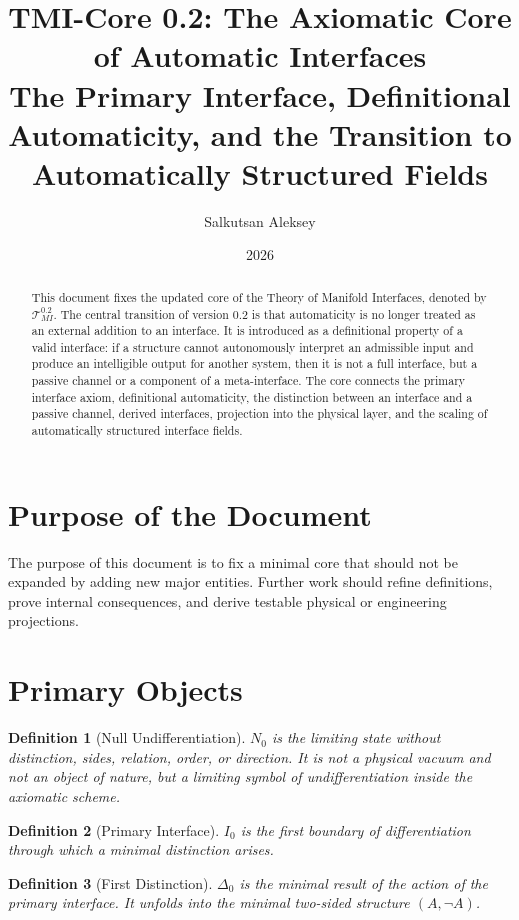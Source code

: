 \documentclass[12pt,a4paper]{article}
\title{\textbf{TMI-Core 0.2: The Axiomatic Core of Automatic Interfaces}\\
\large The Primary Interface, Definitional Automaticity, and the Transition to Automatically Structured Fields}
\author{Salkutsan Aleksey}
\date{2026}
\newtheorem{definition}{Definition}
\begin{document}
\maketitle

\begin{abstract}
This document fixes the updated core of the Theory of Manifold Interfaces, denoted by \(\mathcal T_{MI}^{0.2}\). The central transition of version 0.2 is that automaticity is no longer treated as an external addition to an interface. It is introduced as a definitional property of a valid interface: if a structure cannot autonomously interpret an admissible input and produce an intelligible output for another system, then it is not a full interface, but a passive channel or a component of a meta-interface. The core connects the primary interface axiom, definitional automaticity, the distinction between an interface and a passive channel, derived interfaces, projection into the physical layer, and the scaling of automatically structured interface fields.
\end{abstract}

\tableofcontents
\newpage

\section{Purpose of the Document}
The purpose of this document is to fix a minimal core that should not be expanded by adding new major entities. Further work should refine definitions, prove internal consequences, and derive testable physical or engineering projections.

\section{Primary Objects}
\begin{definition}[Null Undifferentiation]
\(N_0\) is the limiting state without distinction, sides, relation, order, or direction. It is not a physical vacuum and not an object of nature, but a limiting symbol of undifferentiation inside the axiomatic scheme.
\end{definition}

\begin{definition}[Primary Interface]
\(I_0\) is the first boundary of differentiation through which a minimal distinction arises.
\end{definition}

\begin{definition}[First Distinction]
\(\Delta_0\) is the minimal result of the action of the primary interface. It unfolds into the minimal two-sided structure \((A,\neg A)\).
\end{definition}
\end{document}
